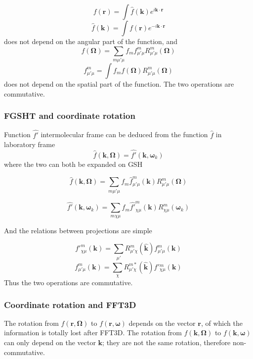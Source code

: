 \begin{equation}
f(\mathbf{r})=\int\hat{f}(\mathbf{k})e^{i\mathbf{k}\cdot\mathbf{r}}
\end{equation}
\begin{equation}
\hat{f}(\mathbf{k})=\int f(\mathbf{r})e^{-i\mathbf{k}\cdot\mathbf{r}}
\end{equation}
does not depend on the angular part of the function, and
\begin{equation}
f(\mathbf{\Omega})=\sum_{m\mu'\mu}f_{m}f_{\mu'\mu}^{m}R_{\mu'\mu}^{m}(\mathbf{\Omega})
\end{equation}
\begin{equation}
f_{\mu'\mu}^{m}=\int f_{m}f(\mathbf{\Omega})R_{\mu'\mu}^{m}(\mathbf{\Omega})
\end{equation}
does not depend on the spatial part of the function. The two operations
are commutative.

\subsubsection{FGSHT and coordinate rotation}

Function $\hat{f'}$ intermolecular frame can be deduced from the
function $\hat{f}$ in laboratory frame 
\[
\hat{f}(\mathbf{k},\mathbf{\Omega})=\hat{f'}(\mathbf{k},\boldsymbol{\omega}_{k})
\]
where the two can both be expanded on \acs{GSH}

\[
\hat{f}(\mathbf{k},\mathbf{\Omega})=\sum_{m\mu'\mu}f_{m}\hat{f}_{\mu'\mu}^{m}(\mathbf{k})R_{\mu'\mu}^{m}(\mathbf{\Omega})
\]

\[
\hat{f'}(\mathbf{k},\boldsymbol{\omega}_{k})=\sum_{m\chi\mu}f_{m}\hat{f'}_{\chi\mu}^{m}(\mathbf{k})R_{\chi\mu}^{m}(\boldsymbol{\omega}_{k})
\]

And the relations between projections are simple

\[
f'_{\chi\mu}^{m}(\mathbf{k})=\sum_{\mu'}R_{\mu'\chi}^{m}(\hat{\mathbf{k}})f_{\mu'\mu}^{m}(\mathbf{k})
\]
\[
f_{\mu'\mu}^{m}(\mathbf{k})=\sum_{\chi}R_{\mu'\chi}^{m*}(\hat{\mathbf{k}})f'{}_{\chi\mu}^{m}(\mathbf{k})
\]
Thus the two operations are commutative.

\subsubsection{Coordinate rotation and FFT3D}

The rotation from $f(\mathbf{r},\mathbf{\Omega})$ to $f(\mathbf{r},\boldsymbol{\omega})$
depends on the vector $\mathbf{r}$, of which the information is totally
lost after FFT3D. The rotation from $f(\mathbf{k},\mathbf{\Omega})$
to $f(\mathbf{k},\boldsymbol{\omega})$ can only depend on the vector
$\mathbf{k}$; they are not the same rotation, therefore non-commutative. 

